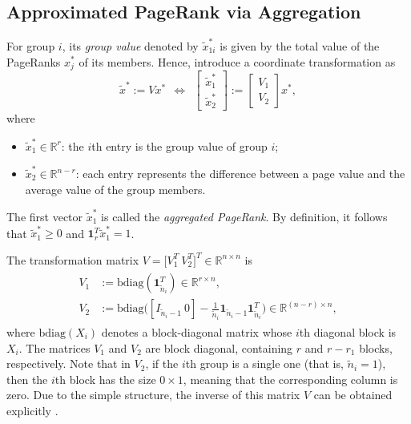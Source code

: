 \documentclass[11pt,draftcls,onecolumn]{IEEEtran}
\newcommand{\field}[1]{{\mathbb{#1}}}
\newcommand{\one}{\mathbf{1}}
\newcommand{\R}{\field{R}}
\begin{document}
\subsection*{Approximated PageRank via Aggregation}

For group $i$, its \textit{group value} denoted by $\widetilde{x}_{1i}^*$ 
is given by the total value of the PageRanks $x_j^*$ of its members. 
Hence, introduce a coordinate transformation as
\begin{equation*}
\widetilde{x}^*:=Vx^*
~~\Leftrightarrow~~
     \begin{bmatrix}
        \widetilde{x}_1^*\\
        \widetilde{x}_2^*
     \end{bmatrix}
   := \begin{bmatrix}
         V_1\\ V_2
      \end{bmatrix} x^*,
  \label{eqn:xtilde}
\end{equation*}
where
\begin{itemize}
 \item $\widetilde{x}_1^*\in\R^{r}$: the $i$th entry is the group value of group $i$;
 \item $\widetilde{x}_2^*\in\R^{n-r}$: each entry represents the difference between 
                                   a page value and the average value of the group members.
\end{itemize}
The first vector $\widetilde{x}_1^*$ is called the \textit{aggregated PageRank}.
By definition, it follows that $\widetilde{x}_1^*\geq 0$ and
$\one_r^T\widetilde{x}_1^*=1$.

The transformation matrix $V = \big[V_1^T~V_2^T\big]^T\in\R^{n\times n}$ is
\begin{align}
\begin{split}
 V_1 &:= \text{bdiag}
            (\one_{\widetilde{n}_i}^T)
            \in\R^{r\times n},\\
 V_2 &:= \text{bdiag}
         \Big(
          [I_{\widetilde{n}_i-1}~0]
            - \frac{1}{\widetilde{n}_i} 
               \one_{\widetilde{n}_i-1}\one_{\widetilde{n}_i}^T
         \Big)
         \in\R^{(n-r)\times n},
\end{split}
\label{eqn:V}
\end{align}
where $\text{bdiag}(X_i)$ denotes a block-diagonal matrix
whose $i$th diagonal block is $X_i$.
The matrices $V_1$ and $V_2$ are block diagonal,
containing $r$ and $r-r_1$ blocks, respectively. 
Note that in $V_2$, if the $i$th group is a single one
(that is, $\widetilde{n}_i=1$), then the $i$th block has the size
$0\times 1$, meaning that the corresponding column is zero. 
Due to the simple structure, the inverse of this matrix $V$ 
can be obtained explicitly \cite{IshTemBai:12}.  
\end{document}

